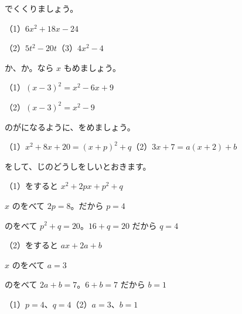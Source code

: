\begingroup{}%
\noindent\begin{minipage}[t]{0.49\linewidth}
\begin{jibun}
でくくりましょう。\par
（1）$6x^2+18x-24$\par
（2）$5t^2-20t$\quad（3）$4x^2-4$
\end{jibun}
\end{minipage}\hfill
\begin{minipage}[t]{0.49\linewidth}
\begin{jibun}
か、か。なら $x$ もめましょう。\par
（1）$(x-3)^2=x^2-6x+9$\par
（2）$(x-3)^2=x^2-9$
\end{jibun}
\end{minipage}\par
\endgroup

\begin{reidai}[\R{係数}{けい|すう}を\R{比}{くら}べて、\R{数}{かず}を\R{決}{き}める]
のがになるように、をめましょう。\par
（1）$x^2+8x+20=(x+p)^2+q$\qquad（2）$3x+7=a(x+2)+b$\par
\kangaekata {}をして、じのどうしをしいとおきます。\par
\shiki（1）\nobreak {}をすると $x^2+2px+p^2+q$\par
\hspace*{2.6\zw}\phantom{（1）}$x$ のをべて $2p=8$。だから $p=4$\par
\hspace*{2.6\zw}\phantom{（1）}のをべて $p^2+q=20$。$16+q=20$ だから $q=4$\par
\hspace*{2.6\zw}（2）\nobreak {}をすると $ax+2a+b$\par
\hspace*{2.6\zw}\phantom{（2）}$x$ のをべて $a=3$\par
\hspace*{2.6\zw}\phantom{（2）}のをべて $2a+b=7$。$6+b=7$ だから $b=1$\par
\kotae（1）\nobreak $p=4$、$q=4$\qquad（2）\nobreak $a=3$、$b=1$
\end{reidai}

